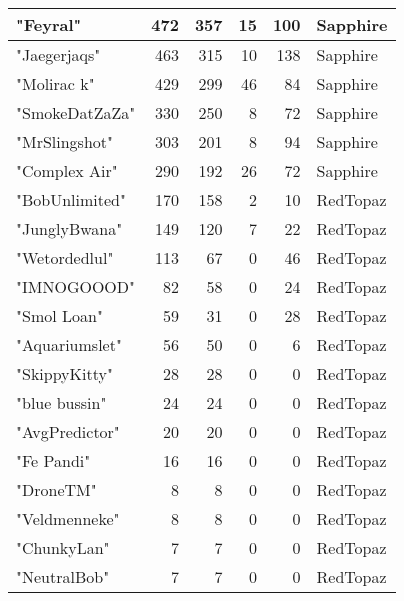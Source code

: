 \documentclass{article}
\begin{document}
\begin{table}[htbp]
\begin{tabular}{|l|r|r|r|r|l|}
"Feyral" & 472 & 357 & 15 & 100 & Sapphire \\ \hline
"Jaegerjaqs" & 463 & 315 & 10 & 138 & Sapphire \\ \hline
"Molirac k" & 429 & 299 & 46 & 84 & Sapphire \\ \hline
"SmokeDatZaZa" & 330 & 250 & 8 & 72 & Sapphire \\ \hline
"MrSlingshot" & 303 & 201 & 8 & 94 & Sapphire \\ \hline
"Complex Air" & 290 & 192 & 26 & 72 & Sapphire \\ \hline
"BobUnlimited" & 170 & 158 & 2 & 10 & RedTopaz \\ \hline
"JunglyBwana" & 149 & 120 & 7 & 22 & RedTopaz \\ \hline
"Wetordedlul" & 113 & 67 & 0 & 46 & RedTopaz \\ \hline
"IMNOGOOOD" & 82 & 58 & 0 & 24 & RedTopaz \\ \hline
"Smol Loan" & 59 & 31 & 0 & 28 & RedTopaz \\ \hline
"Aquariumslet" & 56 & 50 & 0 & 6 & RedTopaz \\ \hline
"SkippyKitty" & 28 & 28 & 0 & 0 & RedTopaz \\ \hline
"blue bussin" & 24 & 24 & 0 & 0 & RedTopaz \\ \hline
"AvgPredictor" & 20 & 20 & 0 & 0 & RedTopaz \\ \hline
"Fe Pandi" & 16 & 16 & 0 & 0 & RedTopaz \\ \hline
"DroneTM" & 8 & 8 & 0 & 0 & RedTopaz \\ \hline
"Veldmenneke" & 8 & 8 & 0 & 0 & RedTopaz \\ \hline
"ChunkyLan" & 7 & 7 & 0 & 0 & RedTopaz \\ \hline
"NeutralBob" & 7 & 7 & 0 & 0 & RedTopaz \\ \hline
\end{tabular}
\end{table}
\end{document}

